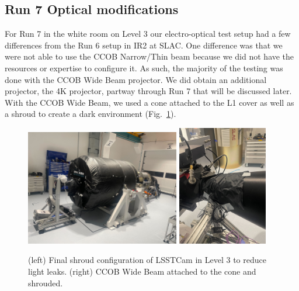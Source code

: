 \subsection{Run 7 Optical modifications}\label{run-7-optical-modifications}

For Run 7 in the white room on Level 3 our electro-optical test setup had a few differences from the Run 6 setup in IR2 at SLAC. One difference was that we were not able to use the CCOB Narrow/Thin beam because we did not have the resources or expertise to configure it. As
such, the majority of the testing was done with the CCOB Wide Beam
projector. We did obtain an additional projector, the 4K projector, partway through Run 7 that will be discussed later. With the CCOB Wide Beam,
we used a cone attached to the L1 cover as well as a shroud to create a
dark environment (Fig.~\ref{fig:LSSTCam_config}).

\begin{figure}[htbp]
\centering
    \includegraphics[width=0.6\textwidth]{figures/Camera_Shroud.jpg} 
    \includegraphics[width=0.35\textwidth]{figures/CCOB_Wide_Shroud.jpg} \\
\caption{(left) Final shroud configuration of LSSTCam in Level 3 to reduce light leaks. (right) CCOB Wide Beam attached to the cone and shrouded.}
\label{fig:LSSTCam_config}
\end{figure}


